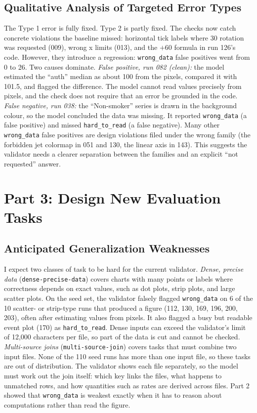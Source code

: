 \documentclass[11pt]{article}
\begin{document}
\subsection{Qualitative Analysis of Targeted Error Types}
The Type 1 error is fully fixed. Type 2 is partly
fixed. The checks now catch concrete violations the baseline missed: horizontal
tick labels where 30\textdegree{} rotation was requested (009), wrong x limits
(013), and the $+60$ formula in run 126's code. However, they introduce a
regression: \texttt{wrong\_data} false positives went from 0 to 26. Two causes
dominate. \emph{False positive, run 082 (clean):} the model estimated the
``auth'' median as about 100 from the pixels, compared it with 101.5, and flagged
the difference. The model cannot read values precisely from pixels, and the check
does not require that an error be grounded in the code.
\emph{False negative, run 038:} the ``Non-smoker'' series is drawn in the
background colour, so the model concluded the data was missing. It reported
\texttt{wrong\_data} (a false positive) and missed \texttt{hard\_to\_read} (a
false negative). Many other \texttt{wrong\_data} false positives are design
violations filed under the wrong family (the forbidden jet colormap in 051 and
130, the linear axis in 143). This suggests the validator needs a clearer
separation between the families and an explicit ``not requested'' answer.

\section{Part 3: Design New Evaluation Tasks}

\subsection{Anticipated Generalization Weaknesses}
I expect two classes of task to be hard for the current validator.
\emph{Dense, precise data} (\texttt{dense-precise-data}) covers charts with many
points or labels where correctness depends on exact values, such as dot plots,
strip plots, and large scatter plots. On the seed set, the validator falsely
flagged \texttt{wrong\_data} on 6 of the 10 scatter- or strip-type runs that
produced a figure (112, 130, 169, 196, 200, 203), often after estimating values
from pixels. It also flagged a busy but readable event plot (170) as
\texttt{hard\_to\_read}. Dense inputs can exceed the validator's limit of 12{,}000
characters per file, so part of the data is cut and cannot be checked.
\emph{Multi-source joins} (\texttt{multi-source-join}) covers tasks that must
combine two input files. None of the 110 seed runs has more than one input file,
so these tasks are out of distribution. The validator shows each file
separately, so the model must work out the join itself: which key links the
files, what happens to unmatched rows, and how quantities such as rates are
derived across files. Part 2 showed that \texttt{wrong\_data} is weakest exactly
when it has to reason about computations rather than read the figure.
\end{document}
